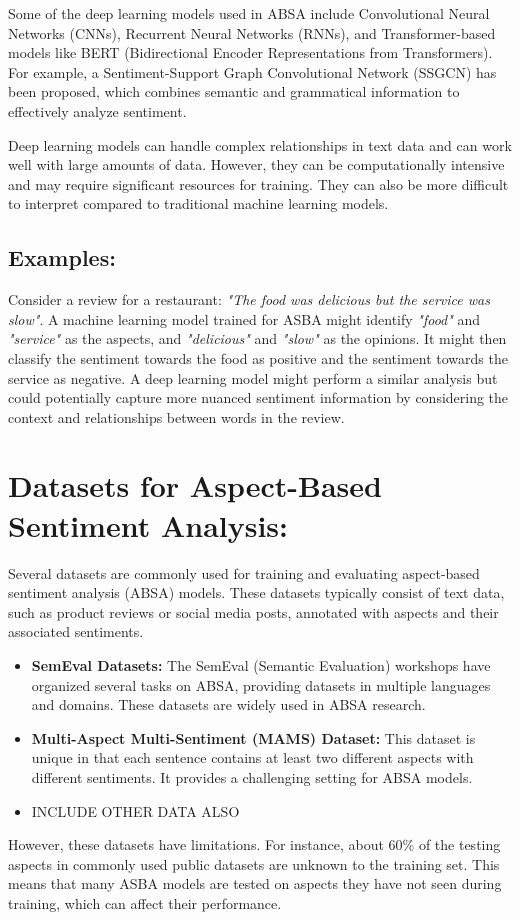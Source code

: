 \documentclass{article}
\begin{document}
Some of the deep learning models used in ABSA include Convolutional Neural Networks (CNNs), Recurrent Neural Networks (RNNs), and Transformer-based models like BERT (Bidirectional Encoder Representations from Transformers)\cite{Dhanith2023ACE}\cite{Kumar2023AspectBasedSA}. For example, a Sentiment-Support Graph Convolutional Network (SSGCN) has been proposed, which combines semantic and grammatical information to effectively analyze sentiment. \cite{Dhanith2023ACE}

Deep learning models can handle complex relationships in text data and can work well with large amounts of data. However, they can be computationally intensive and may require significant resources for training. They can also be more difficult to interpret compared to traditional machine learning models\cite{Kumar2023AspectBasedSA}\cite{Dhanith2023ACE}.

\subsection{Examples: }
Consider a review for a restaurant: \textit{"The food was delicious but the service was slow"}. A machine learning model trained for ASBA might identify \textit{"food"} and \textit{"service"} as the aspects, and \textit{"delicious"} and \textit{"slow"} as the opinions. It might then classify the sentiment towards the food as positive and the sentiment towards the service as negative. A deep learning model might perform a similar analysis but could potentially capture more nuanced sentiment information by considering the context and relationships between words in the review.

\section{Datasets for Aspect-Based Sentiment Analysis: }
Several datasets are commonly used for training and evaluating aspect-based sentiment analysis (ABSA) models. These datasets typically consist of text data, such as product reviews or social media posts, annotated with aspects and their associated sentiments\cite{Dhanith2023ACE}\cite{hua2023systematic}.
\begin{itemize}
    \item \textbf{SemEval Datasets: } The SemEval (Semantic Evaluation) workshops have organized several tasks on ABSA, providing datasets in multiple languages and domains. These datasets are widely used in ABSA research\cite{hua2023systematic}\cite{NazirIssues&Chall2023}.
    \item \textbf{Multi-Aspect Multi-Sentiment (MAMS) Dataset: } This dataset is unique in that each sentence contains at least two different aspects with different sentiments. It provides a challenging setting for ABSA models\cite{Dhanith2023ACE}.
    \item INCLUDE OTHER DATA ALSO
\end{itemize}
However, these datasets have limitations. For instance, about 60\% of the testing aspects in commonly used public datasets are unknown to the training set\cite{hua2023systematic}. This means that many ASBA models are tested on aspects they have not seen during training, which can affect their performance.
\end{document}
